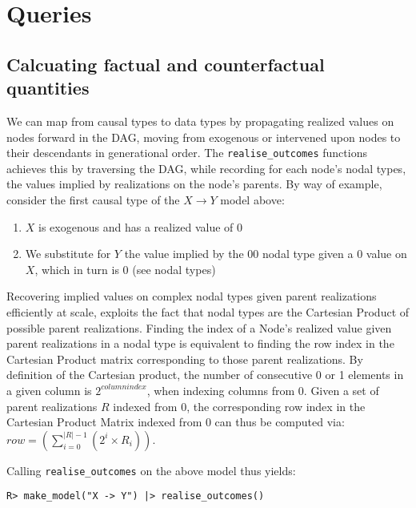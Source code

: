 \documentclass[
  11pt,
  article]{jss}
\providecommand{\tightlist}{%
  \setlength{\itemsep}{0pt}\setlength{\parskip}{0pt}}\usepackage{longtable,booktabs,array}
\begin{document}
\hypertarget{sec-query}{%
\section{Queries}\label{sec-query}}

\hypertarget{calcuating-factual-and-counterfactual-quantities}{%
\subsection{Calcuating factual and counterfactual
quantities}\label{calcuating-factual-and-counterfactual-quantities}}

We can map from causal types to data types by propagating realized
values on nodes forward in the DAG, moving from exogenous or intervened
upon nodes to their descendants in generational order. The
\texttt{realise\_outcomes} functions achieves this by traversing the
DAG, while recording for each node's nodal types, the values implied by
realizations on the node's parents. By way of example, consider the
first causal type of the \(X \rightarrow Y\) model above:

\begin{enumerate}
\def\labelenumi{\arabic{enumi}.}
\tightlist
\item
  \(X\) is exogenous and has a realized value of \(0\)
\item
  We substitute for \(Y\) the value implied by the \(00\) nodal type
  given a \(0\) value on \(X\), which in turn is \(0\) (see nodal types)
\end{enumerate}

Recovering implied values on complex nodal types given parent
realizations efficiently at scale, exploits the fact that nodal types
are the Cartesian Product of possible parent realizations. Finding the
index of a Node's realized value given parent realizations in a nodal
type is equivalent to finding the row index in the Cartesian Product
matrix corresponding to those parent realizations. By definition of the
Cartesian product, the number of consecutive 0 or 1 elements in a given
column is \(2^{columnindex}\), when indexing columns from 0. Given a set
of parent realizations \(R\) indexed from 0, the corresponding row index
in the Cartesian Product Matrix indexed from 0 can thus be computed via:
\(row = (\sum_{i = 0}^{|R| - 1} (2^{i} \times R_i))\).

Calling \texttt{realise\_outcomes} on the above model thus yields:

\begin{verbatim}
R> make_model("X -> Y") |> realise_outcomes()
\end{verbatim}
\end{document}
